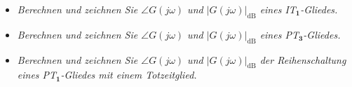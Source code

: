 %
%
\begin{Summary}{}{}
	\begin{itemize}
		\item \textit{Berechnen und zeichnen Sie $\angle G(j\omega)$ und $|G(j\omega)|_{\text{dB}}$ eines IT$_{\boldsymbol{1}}$-Gliedes.}
		\item \textit{Berechnen und zeichnen Sie $\angle G(j\omega)$ und $|G(j\omega)|_{\text{dB}}$ eines PT$_{\boldsymbol{3}}$-Gliedes.}
		\item \textit{Berechnen und zeichnen Sie $\angle G(j\omega)$ und $|G(j\omega)|_{\text{dB}}$ der Reihenschaltung eines PT$_{\boldsymbol{1}}$-Gliedes mit einem Totzeitglied.}
	\end{itemize}
\end{Summary}
%
\newpage
%
